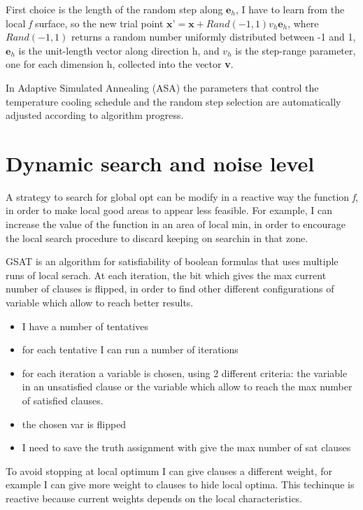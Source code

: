 \documentclass[11pt]{article}
\begin{document}
First choice is the length of the random step along $ \textbf{e}_h $, I  have to learn from the local \textit{f} surface, so the new trial point $ \textbf{x'} = \textbf{x} + Rand(-1,1)v_h \textbf{e}_h $, where $ Rand(-1, 1) $ returns a random number uniformly distributed between -1 and 1,  $ \textbf{e}_h $ is the unit-length vector along direction h, and $ v_h $ is the step-range parameter, one for each dimension h, collected into the vector \textbf{v}.

In Adaptive Simulated Annealing (ASA) the parameters that control the temperature cooling schedule and the random step selection are automatically adjusted according to algorithm progress.

\section{Dynamic search and noise level}
A strategy to search for global opt can be modify in a reactive way the function \textit{f}, in order to make local good areas to appear less feasible. For example, I can increase the value of the function in an area of local min, in order to encourage the local search procedure to discard keeping on searchin in that zone. 

GSAT is an algorithm for satisfiability of boolean formulas that uses multiple runs of local serach. At each iteration, the bit which gives the max current number of clauses is flipped, in order to find other different configurations of variable which allow to reach better results. 

\begin{itemize}
\item I have a number of tentatives
\item for each tentative I can run a number of iterations
\item for each iteration a variable is chosen, using 2 different criteria: the variable in an unsatisfied clause or the variable which allow to reach the max number of satisfied clauses. 
\item the chosen var is flipped
\item I need to save the truth assignment with give the max number of sat clauses
\end{itemize}

To avoid stopping at local optimum I can give clauses a different weight, for example I can give more weight to clauses to hide local optima. This techinque is reactive because current weights depends on the local characteristics. 
\end{document}
